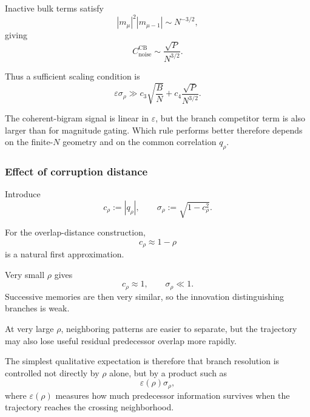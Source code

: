 Inactive bulk terms satisfy
\begin{equation}
|m_\mu|^2|m_{\mu-1}|
\sim
N^{-3/2},
\end{equation}
giving
\begin{equation}
C_{\mathrm{noise}}^{\mathrm{CB}}
\sim
\frac{\sqrt P}{N^{3/2}}.
\end{equation}

Thus a sufficient scaling condition is
\begin{equation}
\varepsilon\sigma_\rho
\gg
c_3\sqrt{\frac{B}{N}}
+
c_4\frac{\sqrt P}{N^{3/2}}.
\label{eq:cb-condition}
\end{equation}

The coherent-bigram signal is linear in $\varepsilon$, but the branch
competitor term is also larger than for magnitude gating.  Which rule performs
better therefore depends on the finite-$N$ geometry and on the common
correlation $q_\rho$.

\subsubsection{Effect of corruption distance}

Introduce
\begin{equation}
c_\rho
:=
|q_\rho|,
\qquad
\sigma_\rho
:=
\sqrt{1-c_\rho^2}.
\end{equation}

For the overlap-distance construction,
\begin{equation}
c_\rho
\approx
1-\rho
\end{equation}
is a natural first approximation.

Very small $\rho$ gives
\begin{equation}
c_\rho\approx1,
\qquad
\sigma_\rho\ll1.
\end{equation}
Successive memories are then very similar, so the innovation distinguishing
branches is weak.

At very large $\rho$, neighboring patterns are easier to separate, but the
trajectory may also lose useful residual predecessor overlap more rapidly.

The simplest qualitative expectation is therefore that branch resolution is
controlled not directly by $\rho$ alone, but by a product such as
\begin{equation}
\varepsilon(\rho)\sigma_\rho,
\end{equation}
where $\varepsilon(\rho)$ measures how much predecessor information survives
when the trajectory reaches the crossing neighborhood.

